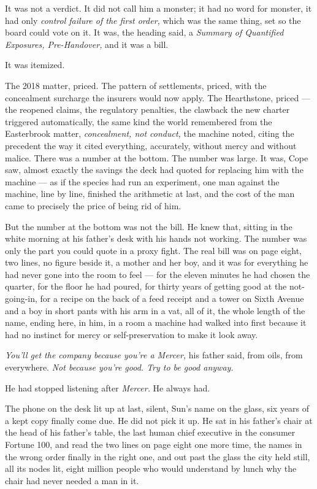 \documentclass[11pt,openany]{book}
\begin{document}
It was not a verdict. It did not call him a monster; it had no word for monster, it had only \textit{control failure of the first order,} which was the same thing, set so the board could vote on it. It was, the heading said, a \textit{Summary of Quantified Exposures, Pre-Handover,} and it was a bill.

It was itemized.

The 2018 matter, priced. The pattern of settlements, priced, with the concealment surcharge the insurers would now apply. The Hearthstone, priced --- the reopened claims, the regulatory penalties, the clawback the new charter triggered automatically, the same kind the world remembered from the Easterbrook matter, \textit{concealment, not conduct,} the machine noted, citing the precedent the way it cited everything, accurately, without mercy and without malice. There was a number at the bottom. The number was large. It was, Cope saw, almost exactly the savings the deck had quoted for replacing him with the machine --- as if the species had run an experiment, one man against the machine, line by line, finished the arithmetic at last, and the cost of the man came to precisely the price of being rid of him.

But the number at the bottom was not the bill. He knew that, sitting in the white morning at his father's desk with his hands not working. The number was only the part you could quote in a proxy fight. The real bill was on page eight, two lines, no figure beside it, a mother and her boy, and it was for everything he had never gone into the room to feel --- for the eleven minutes he had chosen the quarter, for the floor he had poured, for thirty years of getting good at the not-going-in, for a recipe on the back of a feed receipt and a tower on Sixth Avenue and a boy in short pants with his arm in a vat, all of it, the whole length of the name, ending here, in him, in a room a machine had walked into first because it had no instinct for mercy or self-preservation to make it look away.

\textit{You'll get the company because you're a Mercer,} his father said, from oils, from everywhere. \textit{Not because you're good. Try to be good anyway.}

He had stopped listening after \textit{Mercer.} He always had.

The phone on the desk lit up at last, silent, Sun's name on the glass, six years of a kept copy finally come due. He did not pick it up. He sat in his father's chair at the head of his father's table, the last human chief executive in the consumer Fortune 100, and read the two lines on page eight one more time, the names in the wrong order finally in the right one, and out past the glass the city held still, all its nodes lit, eight million people who would understand by lunch why the chair had never needed a man in it.
\end{document}
